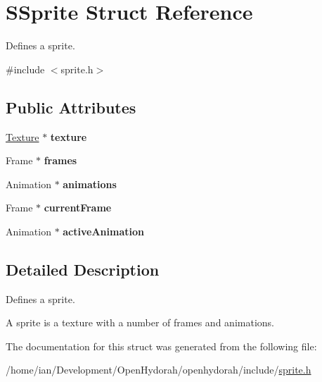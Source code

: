 \hypertarget{structSSprite}{\section{S\-Sprite Struct Reference}
\label{structSSprite}
}


Defines a sprite.  




{\ttfamily \#include $<$sprite.\-h$>$}

\subsection*{Public Attributes}
\begin{DoxyCompactItemize}
\item 
\hypertarget{structSSprite_a1f84cd0db0a40debe871256718a4388b}{\hyperlink{structTexture}{Texture} $\ast$ {\bfseries texture}}\label{structSSprite_a1f84cd0db0a40debe871256718a4388b}

\item 
\hypertarget{structSSprite_adeb6c1317d0738cd0abe4de6a7ec5832}{Frame $\ast$ {\bfseries frames}}\label{structSSprite_adeb6c1317d0738cd0abe4de6a7ec5832}

\item 
\hypertarget{structSSprite_a45e4622565a5b1e1c34d2186d61b9587}{Animation $\ast$ {\bfseries animations}}\label{structSSprite_a45e4622565a5b1e1c34d2186d61b9587}

\item 
\hypertarget{structSSprite_a6a07886d523a5957425a17717a42067e}{Frame $\ast$ {\bfseries current\-Frame}}\label{structSSprite_a6a07886d523a5957425a17717a42067e}

\item 
\hypertarget{structSSprite_af18aa5d474e55720c15b7f2be74a7d52}{Animation $\ast$ {\bfseries active\-Animation}}\label{structSSprite_af18aa5d474e55720c15b7f2be74a7d52}

\end{DoxyCompactItemize}


\subsection{Detailed Description}
Defines a sprite. 

A sprite is a texture with a number of frames and animations. 

The documentation for this struct was generated from the following file\-:\begin{DoxyCompactItemize}
\item 
/home/ian/\-Development/\-Open\-Hydorah/openhydorah/include/\hyperlink{sprite_8h}{sprite.\-h}\end{DoxyCompactItemize}

